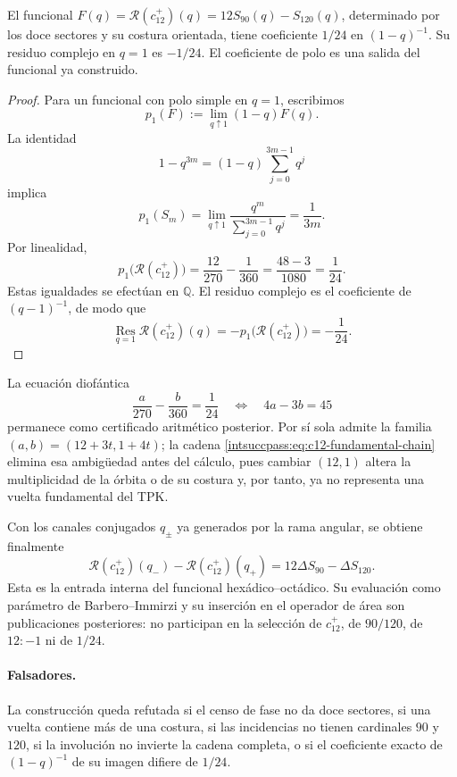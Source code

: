 \begin{theorem}
El funcional \(F(q)=\mathscr R(c_{12}^{+})(q)
=12S_{90}(q)-S_{120}(q)\), determinado por los doce sectores
y su costura orientada, tiene coeficiente \(1/24\) en
\((1-q)^{-1}\). Su residuo complejo en \(q=1\) es \(-1/24\).
El coeficiente de polo es una salida del funcional ya construido.
\end{theorem}

\begin{proof}
Para un funcional con polo simple en \(q=1\), escribimos
\[
 p_1(F):=\lim_{q\uparrow1}(1-q)F(q).
\]
La identidad
\[
 1-q^{3m}=(1-q)\sum_{j=0}^{3m-1}q^j
\]
implica
\[
 p_1(S_m)
 =\lim_{q\uparrow1}\frac{q^m}{\sum_{j=0}^{3m-1}q^j}
 =\frac1{3m}.
\]
Por linealidad,
\[
 p_1\bigl(\mathscr R(c_{12}^{+})\bigr)
 =\frac{12}{270}-\frac1{360}
 =\frac{48-3}{1080}=\frac1{24}.
\]
Estas igualdades se efectúan en \(\mathbb Q\). El residuo complejo
es el coeficiente de \((q-1)^{-1}\), de modo que
\[
 \operatorname*{Res}_{q=1}\mathscr R(c_{12}^{+})(q)
 =-p_1\bigl(\mathscr R(c_{12}^{+})\bigr)=-\frac1{24}.
\]
\end{proof}

La ecuación diofántica
\[
 \frac a{270}-\frac b{360}=\frac1{24}
 \quad\Longleftrightarrow\quad
 4a-3b=45
\]
permanece como certificado aritmético posterior. Por sí sola admite la
familia \((a,b)=(12+3t,1+4t)\); la cadena
\eqref{intsuccpass:eq:c12-fundamental-chain} elimina esa ambigüedad antes del cálculo,
pues cambiar \((12,1)\) altera la multiplicidad de la órbita o de su costura
y, por tanto, ya no representa una vuelta fundamental del TPK.

Con los canales conjugados \(q_\pm\) ya generados por la rama angular, se
obtiene finalmente
\[
 \mathscr R(c_{12}^{+})(q_-)-
 \mathscr R(c_{12}^{+})(q_+)
 =12\Delta S_{90}-\Delta S_{120}.
\]
Esta es la entrada interna del funcional hexádico--octádico. Su evaluación
como parámetro de Barbero--Immirzi y su inserción en el operador de área son
publicaciones posteriores: no participan en la selección de
\(c_{12}^{+}\), de \(90/120\), de \(12:-1\) ni de \(1/24\).

\paragraph{Falsadores.}
La construcción queda refutada si el censo de fase no da doce sectores, si
una vuelta contiene más de una costura, si las incidencias no tienen
cardinales \(90\) y \(120\), si la involución no invierte la cadena completa,
o si el coeficiente exacto de \((1-q)^{-1}\) de su imagen difiere de \(1/24\).
